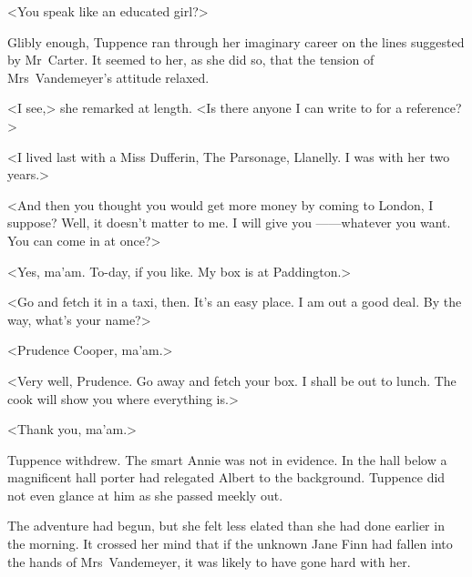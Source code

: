 <You speak like an educated girl?>

Glibly enough, Tuppence ran through her imaginary career on the lines suggested by Mr~Carter. It seemed to her, as she did so, that the tension of Mrs~Vandemeyer's attitude relaxed.

<I see,> she remarked at length. <Is there anyone I can write to for a reference?>

<I lived last with a Miss Dufferin, The Parsonage, Llanelly. I was with her two years.>

<And then you thought you would get more money by coming to London, I suppose? Well, it doesn't matter to me. I will give you ——whatever you want. You can come in at once?>

<Yes, ma'am. To-day, if you like. My box is at Paddington.>

<Go and fetch it in a taxi, then. It's an easy place. I am out a good deal. By the way, what's your name?>

<Prudence Cooper, ma'am.>

<Very well, Prudence. Go away and fetch your box. I shall be out to lunch. The cook will show you where everything is.>

<Thank you, ma'am.>

Tuppence withdrew. The smart Annie was not in evidence. In the hall below a magnificent hall porter had relegated Albert to the background. Tuppence did not even glance at him as she passed meekly out.

The adventure had begun, but she felt less elated than she had done earlier in the morning. It crossed her mind that if the unknown Jane Finn had fallen into the hands of Mrs~Vandemeyer, it was likely to have gone hard with her. 